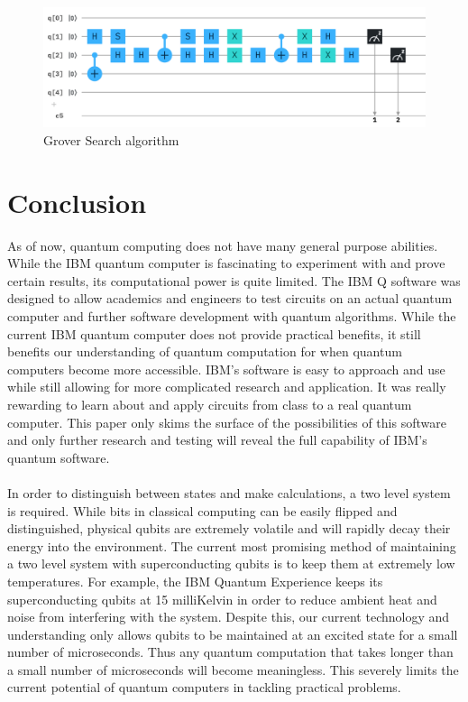 \documentclass[12pt]{article}
\begin{document}
\begin{figure}[ht]
\begin{minipage}{0.35\linewidth}
            \end{minipage}%
            \begin{minipage}{0.65\linewidth}
                \includegraphics[width=\linewidth]{Circuits/grover.png}
            \end{minipage}
            \caption{Grover Search algorithm}
        \end{figure}
    
\section{Conclusion}
    As of now, quantum computing does not have many general purpose abilities. While the IBM quantum computer is fascinating to experiment with and prove certain results, its computational power is quite limited. The IBM Q software was designed to allow academics and engineers to test circuits on an actual quantum computer and further software development with quantum algorithms. While the current IBM quantum computer does not provide practical benefits, it still benefits our understanding of quantum computation for when quantum computers become more accessible. IBM's software is easy to approach and use while still allowing for more complicated research and application. It was really rewarding to learn about and apply circuits from class to a real quantum computer. This paper only skims the surface of the possibilities of this software and only further research and testing will reveal the full capability of IBM's quantum software.
    \\
    \smallskip
    \\
    In order to distinguish between states and make calculations, a two level system is required. While bits in classical computing can be easily flipped and distinguished, physical qubits are extremely volatile and will rapidly decay their energy into the environment. The current most promising method of maintaining a two level system with superconducting qubits is to keep them at extremely low temperatures. For example, the IBM Quantum Experience keeps its superconducting qubits at 15 milliKelvin in order to reduce ambient heat and noise from interfering with the system. Despite this, our current technology and understanding only allows qubits to be maintained at an excited state for a small number of microseconds. Thus any quantum computation that takes longer than a small number of microseconds will become meaningless. This severely limits the current potential of quantum computers in tackling practical problems.
    \\
    \smallskip
    \\
    
\end{document}
